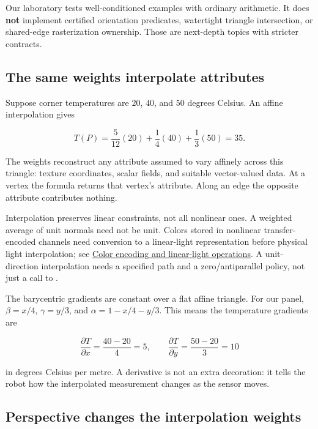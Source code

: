 Our laboratory tests well-conditioned examples with ordinary arithmetic. It does \textbf{not} implement certified orientation predicates, watertight triangle intersection, or shared-edge rasterization ownership. Those are next-depth topics with stricter contracts.

\subsection{The same weights interpolate attributes}\label{01-foundations-i-ch018-the-same-weights-interpolate-attributes}

\hypertarget{01-foundations-i-ch018-the-same-weights-interpolate-attributes}{}

Suppose corner temperatures are \(20\), \(40\), and \(50\) degrees Celsius. An affine interpolation gives

\[
T(P)=\frac5{12}(20)+\frac14(40)+\frac13(50)=35.
\]

The weights reconstruct any attribute assumed to vary affinely across this triangle: texture coordinates, scalar fields, and suitable vector-valued data. At a vertex the formula returns that vertex's attribute. Along an edge the opposite attribute contributes nothing.

Interpolation preserves linear constraints, not all nonlinear ones. A weighted average of unit normals need not be unit. Colors stored in nonlinear transfer-encoded channels need conversion to a linear-light representation before physical light interpolation; see \hyperref[appendix-a9f83ad40792]{Color encoding and linear-light operations}. A unit-direction interpolation needs a specified path and a zero/antiparallel policy, not just a call to .

The barycentric gradients are constant over a flat affine triangle. For our panel, \(\beta=x/4\), \(\gamma=y/3\), and \(\alpha=1-x/4-y/3\). This means the temperature gradients are

\[
\frac{\partial T}{\partial x}=\frac{40-20}{4}=5,
\qquad
\frac{\partial T}{\partial y}=\frac{50-20}{3}=10
\]

in degrees Celsius per metre. A derivative is not an extra decoration: it tells the robot how the interpolated measurement changes as the sensor moves.

\subsection{Perspective changes the interpolation weights}\label{01-foundations-i-ch018-perspective-changes-the-interpolation-weights}


